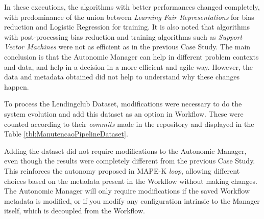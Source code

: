\documentclass[10pt,conference]{IEEEtran}
\begin{document}
In these executions, the algorithms with better performances changed completely, with predominance of the union between \textit{Learning Fair Representations} for bias reduction and Logistic Regression for training. It is also noted that algorithms with post-processing bias reduction and training algorithms such as \textit{Support Vector Machines} were not as efficient as in the previous Case Study. The main conclusion is that the Autonomic Manager can help in different problem contexts and data, and help in a decision in a more efficient and agile way. However, the data and metadata obtained did not help to understand why these changes happen.

To process the Lendingclub Dataset, modifications were necessary to do the system evolution and add this dataset as an option in Workflow. These were counted according to their \textit{commits} made in the repository and displayed in the Table \ref{tbl:ManutencaoPipelineDataset}.

\begin{table}[H]
\begin{center}
  \caption{Number of modifications performed when adding a new dataset to Workflow}
\label{tbl:ManutencaoPipelineDataset}
\end{center}
\end{table}

Adding the dataset did not require modifications to the Autonomic Manager, even though the results were completely different from the previous Case Study. This reinforces the autonomy proposed in MAPE-K \textit{loop}, allowing different choices based on the metadata present in the Workflow without making changes. The Autonomic Manager will only require modifications if the saved Workflow metadata is modified, or if you modify any configuration intrinsic to the Manager itself, which is decoupled from the Workflow.
\end{document}
